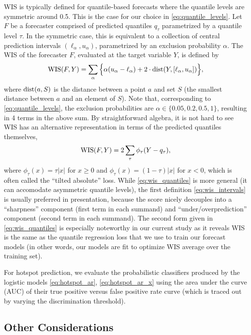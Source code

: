 \documentclass[9pt,twocolumn,twoside,lineno]{pnas-new}
\begin{document}
WIS is typically defined for quantile-based forecasts where the quantile levels
are symmetric around 0.5.  This is the case for our choice in
\eqref{eq:quantile_levels}.  Let $F$ be a forecaster comprised of predicted
quantiles $q_\tau$ parametrized by a quantile level $\tau$.  In the symmetric
case, this is equivalent to a collection of central prediction intervals
$(\ell_\alpha, u_\alpha)$, parametrized by an exclusion probability $\alpha$. 
The WIS of the forecaster $F$, evaluated at the target variable $Y$, is defined
by  
\begin{equation}
\label{eq:wis_intervals}
\mathrm{WIS}(F,Y) = \sum_\alpha \Big\{\alpha(u_\alpha - \ell_\alpha) + 2 \cdot
\mathrm{dist}(Y, [\ell_\alpha, u_\alpha])\Big\},  
\end{equation}
where $\mathrm{dist}(a, S)$ is the distance between a point $a$ and set $S$ (the
smallest distance between $a$ and an element of $S$).  Note that, corresponding 
to \eqref{eq:quantile_levels}, the exclusion probabilities are $\alpha \in
\{0.05, 0.2, 0.5, 1\}$, resulting in 4 terms in the above sum.  By 
straightforward algebra, it is not hard to see WIS has an alternative 
representation in terms of the predicted quantiles themselves,
\begin{equation}
\label{eq:wis_quantiles}
\mathrm{WIS}(F,Y) = 2 \sum_\tau \phi_\tau(Y - q_\tau), 
\end{equation}
where $\phi_\tau(x) = \tau |x|$ for $x \geq 0$ and $\phi_\tau(x) = (1-\tau)
|x|$ for $x<0$, which is often called the ``tilted absolute'' loss.  While
\eqref{eq:wis_quantiles} is more general (it can accomodate asymmetric quantile
levels), the first definition \eqref{eq:wis_intervals} is usually preferred in
presentation, because the score nicely decouples into a ``sharpness'' component
(first term in each summand) and ``under/overprediction'' component (second term
in each summand).  The second form given in \eqref{eq:wis_quantiles} is
especially noteworthy in our current study as it reveals WIS is the same as the
quantile regression loss that we use to train our forecast models (in other
words, our models are fit to optimize WIS average over the training set).   

For hotspot prediction, we evaluate the probabilistic classifiers produced by
the logistic models \eqref{eq:hotspot_ar}, \eqref{eq:hotspot_ar_x} using the
area under the curve (AUC) of their true positive versus false positive rate
curve (which is traced out by varying the discrimination threshold). 

\subsection{Other Considerations}
\end{document}
